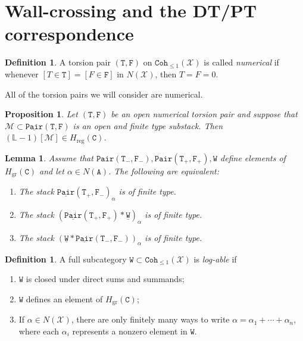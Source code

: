 \documentclass[leqno, openany]{memoir}
\newtheorem{prop}[thm]{Proposition}
\newtheorem{lem}[thm]{Lemma}
\theoremstyle{definition}
\newtheorem{defn}[thm]{Definition}
\theoremstyle{remark}
\theoremstyle{plain}
\theoremstyle{definition}
\theoremstyle{remark}
\renewcommand{\L}{\mathbb{L}}
\newcommand{\mc}[1]{\mathcal{#1}}
\newcommand{\mr}[1]{\mathrm{#1}}
\newcommand{\mt}[1]{\mathtt{#1}}
\newcommand{\ul}[1]{\underline{#1}}
\begin{document}
\section{Wall-crossing and the DT/PT correspondence}

\begin{defn}
    A torsion pair $(\mt{T}, \mt{F})$ on $\mt{Coh}_{\leq 1}(\mc{X})$ is called \textit{numerical} if whenever $[T \in \mt{T}] = [F \in \mt{F}]$ in $N(\mc{X})$, then $T = F = 0$.
\end{defn}
All of the torsion pairs we will consider are numerical.

\begin{prop}
    Let $(\mt{T}, \mt{F})$ be an open numerical torsion pair and suppose that $\mc{M} \subset \mt{\ul{Pair}(T,F)}$ is an open and finite type substack. Then $(\L - 1) [\mc{M}] \in H_{\mr{reg}}(\mt{C})$.
\end{prop}

\begin{lem}
    Assume that $\mt{Pair(T_-, F_-)}, \mt{Pair(T_+, F_+)}, \mt{W}$ define elements of $H_{\mr{gr}}(\mt{C})$ and let $\alpha \in N(\mt{A})$. The following are equivalent:
    \begin{enumerate}
        \item The stack $\mt{\ul{Pair}(T_+, F_-)}_{\alpha}$ is of finite type.
        \item The stack $(\mt{\ul{Pair}(T_+, F_+)} * \mt{\ul{W}})_{\alpha}$ is of finite type.
        \item The stack $(\mt{\ul{W}} * \mt{\ul{Pair}(T_-, F_-)})_{\alpha}$ is of finite type.
    \end{enumerate}
\end{lem}

\begin{defn}
    A full subcategory $\mt{W} \subset \mt{Coh}_{\leq 1}(\mc{X})$ is \textit{log-able} if
    \begin{enumerate}
        \item $\mt{W}$ is closed under direct sums and summands;
        \item $\mt{W}$ defines an element of $H_{\mr{gr}}(\mt{C})$;
        \item If $\alpha \in N(\mc{X})$, there are only finitely many ways to write $\alpha = \alpha_1 + \cdots + \alpha_n$, where each $\alpha_i$ represents a nonzero element in $\mt{W}$.
    \end{enumerate}
\end{defn}
\end{document}
